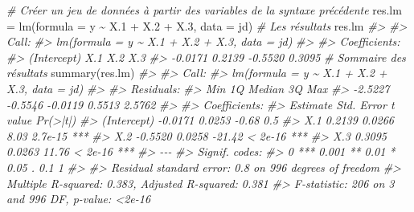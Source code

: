 \documentclass[
]{book}
\newenvironment{Shaded}{}{}
\newcommand{\AttributeTok}[1]{#1}
\newcommand{\CommentTok}[1]{\textit{#1}}
\newcommand{\FloatTok}[1]{#1}
\newcommand{\FunctionTok}[1]{#1}
\newcommand{\NormalTok}[1]{#1}
\newcommand{\OtherTok}[1]{#1}
\newcommand{\SpecialCharTok}[1]{#1}
\begin{document}
\begin{Shaded}
\begin{Highlighting}[]
\CommentTok{\# Créer un jeu de données à partir des variables de la syntaxe précédente}
\NormalTok{res.lm }\OtherTok{=} \FunctionTok{lm}\NormalTok{(}\AttributeTok{formula =}\NormalTok{ y }\SpecialCharTok{\textasciitilde{}}\NormalTok{ X}\FloatTok{.1} \SpecialCharTok{+}\NormalTok{ X}\FloatTok{.2} \SpecialCharTok{+}\NormalTok{ X}\FloatTok{.3}\NormalTok{, }\AttributeTok{data =}\NormalTok{ jd)}
\CommentTok{\# Les résultats}
\NormalTok{res.lm}
\CommentTok{\#\textgreater{} }
\CommentTok{\#\textgreater{} Call:}
\CommentTok{\#\textgreater{} lm(formula = y \textasciitilde{} X.1 + X.2 + X.3, data = jd)}
\CommentTok{\#\textgreater{} }
\CommentTok{\#\textgreater{} Coefficients:}
\CommentTok{\#\textgreater{} (Intercept)          X.1          X.2          X.3  }
\CommentTok{\#\textgreater{}     {-}0.0171       0.2139      {-}0.5520       0.3095}
\CommentTok{\# Sommaire des résultats}
\FunctionTok{summary}\NormalTok{(res.lm)}
\CommentTok{\#\textgreater{} }
\CommentTok{\#\textgreater{} Call:}
\CommentTok{\#\textgreater{} lm(formula = y \textasciitilde{} X.1 + X.2 + X.3, data = jd)}
\CommentTok{\#\textgreater{} }
\CommentTok{\#\textgreater{} Residuals:}
\CommentTok{\#\textgreater{}     Min      1Q  Median      3Q     Max }
\CommentTok{\#\textgreater{} {-}2.5227 {-}0.5546 {-}0.0119  0.5513  2.5762 }
\CommentTok{\#\textgreater{} }
\CommentTok{\#\textgreater{} Coefficients:}
\CommentTok{\#\textgreater{}             Estimate Std. Error t value Pr(\textgreater{}|t|)    }
\CommentTok{\#\textgreater{} (Intercept)  {-}0.0171     0.0253   {-}0.68      0.5    }
\CommentTok{\#\textgreater{} X.1           0.2139     0.0266    8.03  2.7e{-}15 ***}
\CommentTok{\#\textgreater{} X.2          {-}0.5520     0.0258  {-}21.42  \textless{} 2e{-}16 ***}
\CommentTok{\#\textgreater{} X.3           0.3095     0.0263   11.76  \textless{} 2e{-}16 ***}
\CommentTok{\#\textgreater{} {-}{-}{-}}
\CommentTok{\#\textgreater{} Signif. codes:  }
\CommentTok{\#\textgreater{} 0 \textquotesingle{}***\textquotesingle{} 0.001 \textquotesingle{}**\textquotesingle{} 0.01 \textquotesingle{}*\textquotesingle{} 0.05 \textquotesingle{}.\textquotesingle{} 0.1 \textquotesingle{} \textquotesingle{} 1}
\CommentTok{\#\textgreater{} }
\CommentTok{\#\textgreater{} Residual standard error: 0.8 on 996 degrees of freedom}
\CommentTok{\#\textgreater{} Multiple R{-}squared:  0.383,  Adjusted R{-}squared:  0.381 }
\CommentTok{\#\textgreater{} F{-}statistic:  206 on 3 and 996 DF,  p{-}value: \textless{}2e{-}16}
\end{Highlighting}
\end{Shaded}
\end{document}
